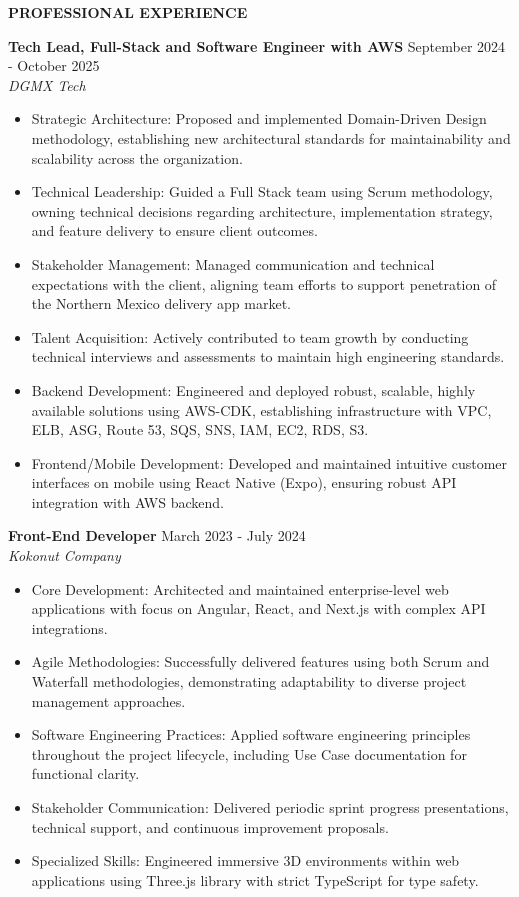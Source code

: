 \documentclass[11pt,letterpaper]{article}
\newcommand{\sectiontitle}[1]{
  {\large\textbf{#1}}
  \vspace{3pt}
}
\newcommand{\jobtitle}[4]{
  {\textbf{#1}} \hfill {#2} \\
  {\textit{#3}} \hfill {#4} \\
}
\begin{document}
\sectiontitle{PROFESSIONAL EXPERIENCE}

\jobtitle{Tech Lead, Full-Stack and Software Engineer with AWS}{September 2024 - October 2025}{DGMX Tech}{}
\begin{itemize}
  \setlength{\itemsep}{0pt}
  \setlength{\parskip}{3pt}
  \item Strategic Architecture: Proposed and implemented Domain-Driven Design methodology, establishing new architectural standards for maintainability and scalability across the organization.
  \item Technical Leadership: Guided a Full Stack team using Scrum methodology, owning technical decisions regarding architecture, implementation strategy, and feature delivery to ensure client outcomes.
  \item Stakeholder Management: Managed communication and technical expectations with the client, aligning team efforts to support penetration of the Northern Mexico delivery app market.
  \item Talent Acquisition: Actively contributed to team growth by conducting technical interviews and assessments to maintain high engineering standards.
  \item Backend Development: Engineered and deployed robust, scalable, highly available solutions using AWS-CDK, establishing infrastructure with VPC, ELB, ASG, Route 53, SQS, SNS, IAM, EC2, RDS, S3.
  \item Frontend/Mobile Development: Developed and maintained intuitive customer interfaces on mobile using React Native (Expo), ensuring robust API integration with AWS backend.
\end{itemize}
\vspace{6pt}

\jobtitle{Front-End Developer}{March 2023 - July 2024}{Kokonut Company}{}
\begin{itemize}
  \setlength{\itemsep}{0pt}
  \setlength{\parskip}{3pt}
  \item Core Development: Architected and maintained enterprise-level web applications with focus on Angular, React, and Next.js with complex API integrations.
  \item Agile Methodologies: Successfully delivered features using both Scrum and Waterfall methodologies, demonstrating adaptability to diverse project management approaches.
  \item Software Engineering Practices: Applied software engineering principles throughout the project lifecycle, including Use Case documentation for functional clarity.
  \item Stakeholder Communication: Delivered periodic sprint progress presentations, technical support, and continuous improvement proposals.
  \item Specialized Skills: Engineered immersive 3D environments within web applications using Three.js library with strict TypeScript for type safety.
\end{itemize}
\vspace{6pt}
\end{document}
